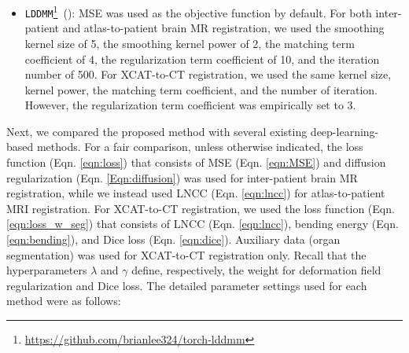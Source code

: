 \documentclass[times,twocolumn,final]{elsarticle}
\begin{document}
\begin{itemize}[noitemsep]
    \item \texttt{LDDMM}\footnote{\url{https://github.com/brianlee324/torch-lddmm}}~(\cite{beg2005computing}): MSE was used as the objective function by default. For both inter-patient and atlas-to-patient brain MR registration, we used the smoothing kernel size of 5, the smoothing kernel power of 2, the matching term coefficient of 4, the regularization term coefficient of 10, and the iteration number of 500. For XCAT-to-CT registration, we used the same kernel size, kernel power, the matching term coefficient, and the number of iteration. However, the regularization term coefficient was empirically set to 3.
\end{itemize}

Next, we compared the proposed method with several existing deep-learning-based methods. For a fair comparison, unless otherwise indicated, the loss function (Eqn. \ref{eqn:loss}) that consists of MSE (Eqn. \ref{eqn:MSE}) and diffusion regularization (Eqn. \ref{Eqn:diffusion}) was used for inter-patient brain MR registration, while we instead used LNCC (Eqn. \ref{eqn:lncc}) for atlas-to-patient MRI registration. For XCAT-to-CT registration, we used the loss function (Eqn. \ref{eqn:loss_w_seg}) that consists of LNCC (Eqn. \ref{eqn:lncc}), bending energy (Eqn. \ref{eqn:bending}), and Dice loss (Eqn. \ref{eqn:dice}). Auxiliary data (organ segmentation) was used for XCAT-to-CT registration only. Recall that the hyperparameters $\lambda$ and $\gamma$ define, respectively, the weight for deformation field regularization and Dice loss. The detailed parameter settings used for each method were as follows: 
\end{document}
